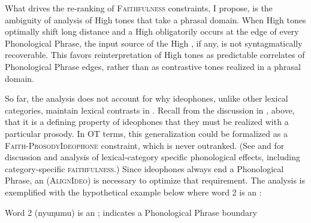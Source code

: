 \documentclass[output=paper
,newtxmath
,modfonts
,nonflat]{langsci/langscibook}
\begin{document}
What drives the re-ranking of \textsc{Faithfulness} constraints, I propose, is the ambiguity of analysis of High tones that take a phrasal domain. When High tones optimally shift long distance and a High  obligatorily occurs at the edge of every Phonological Phrase, the input source of the High , if any, is not syntagmatically recoverable. This favors reinterpretation of High tones as predictable correlates of Phonological Phrase edges, rather than as contrastive tones realized in a phrasal domain.

So far, the analysis does not account for why ideophones, unlike other lexical categories, maintain lexical  contrasts in . Recall from the discussion in , above, that it is a defining property of ideophones that they must be realized with a particular prosody. In OT terms, this generalization could be formalized as a \textsc{Faith-ProsodyIdeophone} constraint, which is never outranked. (See \citealt{Shih&Inkelas2015} and \citealt{Smith2011} for discussion and analysis of lexical-category specific phonological effects, including category-specific \textsc{faithfulness}.) Since ideophones always end a Phonological Phrase, an  (\textsc{AlignIdeo}) is necessary to optimize that requirement. The analysis is exemplified with the hypothetical example below where word 2 is an :

\begin{comment}
\ea 
 \gll \\
   \\
 \glt
\z
\end{comment}

\ea\label{ex:downing:25}  Word 2 (nyuŋumu) is an ; {\textbar} indicates a Phonological   Phrase boundary
\z
\end{document}
